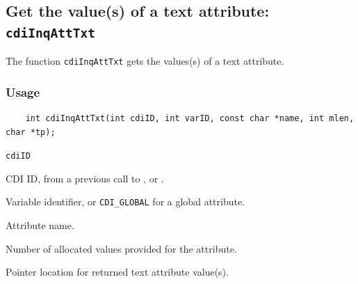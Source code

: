 \subsection{Get the value(s) of a text attribute: \texttt{cdiInqAttTxt}}
\label{cdiInqAttTxt}

The function {\texttt{cdiInqAttTxt}} gets the values(s) of a text attribute.

\subsubsection*{Usage}

\begin{verbatim}
    int cdiInqAttTxt(int cdiID, int varID, const char *name, int mlen, char *tp);
\end{verbatim}

\hspace*{4mm}\begin{minipage}[]{15cm}
\begin{deflist}{\texttt{cdiID}\ }
\item[\texttt{cdiID}]
CDI ID, from a previous call to {}, {} or {}.
\item[\texttt{varID}]
Variable identifier, or {\texttt{CDI\_GLOBAL}} for a global attribute.
\item[\texttt{name}]
Attribute name.
\item[\texttt{mlen}]
Number of allocated values provided for the attribute.
\item[\texttt{tp}]
Pointer location for returned text attribute value(s).

\end{deflist}
\end{minipage}
